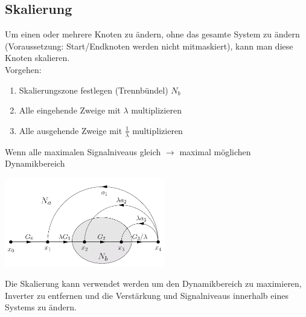 \subsection{Skalierung}
	Um einen oder mehrere Knoten zu ändern, ohne das gesamte System zu
	ändern (Voraussetzung: Start/Endknoten werden nicht mitmaskiert), kann man
	diese Knoten skalieren.\\
	Vorgehen: 
	\begin{enumerate}
                \item Skalierungszone festlegen (Trennbündel) $N_b$
                \item Alle eingehende Zweige mit $\lambda$ multiplizieren
                \item Alle ausgehende Zweige mit $\frac{1}{\lambda}$
                multiplizieren
    \end{enumerate}
    Wenn alle maximalen Signalniveaus gleich $\rightarrow$ maximal möglichen
    Dynamikbereich\\
    \begin{minipage}{9cm}
      \includegraphics[width=7cm]{./images/sfd-scalierung.png}
    \end{minipage}
    \begin{minipage}{9cm}
      Die Skalierung kann verwendet werden um den Dynamikbereich zu maximieren, Inverter zu entfernen
      und die Verstärkung und Signalniveaus innerhalb eines Systems zu ändern.
    \end{minipage}
    
